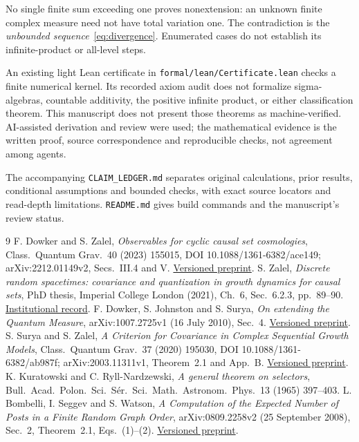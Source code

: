 \documentclass[11pt]{article}
\theoremstyle{definition}
\begin{document}
No single finite sum exceeding one proves nonextension: an unknown finite
complex measure need not have total variation one. The contradiction is the
\emph{unbounded sequence}~\eqref{eq:divergence}. Enumerated cases do not
establish its infinite-product or all-level steps.

An existing light Lean certificate in \texttt{formal/lean/Certificate.lean}
checks a finite numerical kernel. Its recorded axiom audit does not formalize
sigma-algebras, countable additivity, the positive infinite product, or either
classification theorem. This manuscript does not present those theorems as
machine-verified. AI-assisted derivation and review were used; the mathematical
evidence is the written proof, source correspondence and reproducible checks,
not agreement among agents.

The accompanying \texttt{CLAIM\_LEDGER.md} separates original calculations,
prior results, conditional assumptions and bounded checks, with exact source
locators and read-depth limitations. \texttt{README.md} gives build commands
and the manuscript's review status.

\begin{thebibliography}{9}
 F. Dowker and S. Zalel,
\emph{Observables for cyclic causal set cosmologies},
Class.\ Quantum Grav.\ 40 (2023) 155015, DOI 10.1088/1361-6382/ace149;
arXiv:2212.01149v2, Secs.~III.4 and V.
\href{https://arxiv.org/abs/2212.01149v2}{Versioned preprint}.
 S. Zalel,
\emph{Discrete random spacetimes: covariance and quantization in growth
dynamics for causal sets}, PhD thesis, Imperial College London (2021),
Ch.~6, Sec.~6.2.3, pp.~89--90.
\href{https://spiral.imperial.ac.uk/entities/publication/dfb9da9a-7d49-4b1a-9f34-7f19b5c9afcf}{Institutional record}.
 F. Dowker, S. Johnston and S. Surya,
\emph{On extending the Quantum Measure}, arXiv:1007.2725v1
(16 July 2010), Sec.~4.
\href{https://arxiv.org/abs/1007.2725v1}{Versioned preprint}.
 S. Surya and S. Zalel,
\emph{A Criterion for Covariance in Complex Sequential Growth Models},
Class.\ Quantum Grav.\ 37 (2020) 195030, DOI 10.1088/1361-6382/ab987f;
arXiv:2003.11311v1, Theorem~2.1 and App.~B.
\href{https://arxiv.org/abs/2003.11311v1}{Versioned preprint}.
 K. Kuratowski and C. Ryll-Nardzewski,
\emph{A general theorem on selectors},
Bull.\ Acad.\ Polon.\ Sci.\ S\'er.\ Sci.\ Math.\ Astronom.\ Phys.\ 13 (1965)
397--403.
 L. Bombelli, I. Seggev and S. Watson,
\emph{A Computation of the Expected Number of Posts in a Finite Random Graph
Order}, arXiv:0809.2258v2 (25 September 2008), Sec.~2, Theorem~2.1,
Eqs.~(1)--(2).
\href{https://arxiv.org/abs/0809.2258v2}{Versioned preprint}.
\end{thebibliography}
\end{document}
